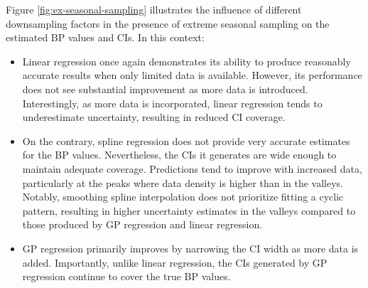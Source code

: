 Figure \ref{fig:ex-seasonal-sampling} illustrates the influence of different
downsampling factors in the presence of extreme seasonal sampling on the estimated
BP values and CIs. In this context:
\begin{itemize}
    \item Linear regression once again demonstrates its ability to produce
    reasonably accurate results when only limited data is available.
    However, its performance does not see substantial improvement as more data is introduced.
    Interestingly, as more data is incorporated, linear regression tends to underestimate uncertainty,
    resulting in reduced CI coverage.
    \item On the contrary, spline regression does not provide very accurate estimates
    for the BP values. Nevertheless, the CIs it generates are wide enough to maintain
    adequate coverage.
    Predictions tend to improve with increased data, particularly at the peaks
    where data density is higher than in the valleys.
    Notably, smoothing spline interpolation does not prioritize fitting a cyclic pattern,
    resulting in higher uncertainty estimates in the valleys compared to those
    produced by GP regression and linear regression.
    \item GP regression primarily improves by narrowing the CI width as more data is added.
    Importantly, unlike linear regression, the CIs generated by GP regression continue
    to cover the true BP values.
\end{itemize}


